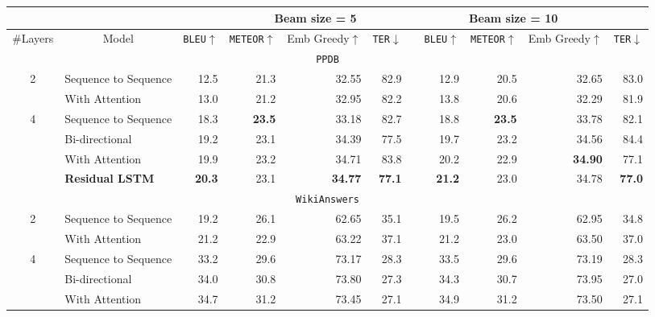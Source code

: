 \begin{center}
\begin{table}
\footnotesize
    \hspace*{-4em}
    \begin{tabular}{@{}clrrrrcrrrr}
        \toprule
        &&& \multicolumn{3}{c}{Beam size = 5} & \phantom{abc} & \multicolumn{3}{c}{Beam size = 10}\tabularnewline
        \midrule
        \#Layers & \multicolumn{1}{c}{Model} & \scriptsize{\texttt{BLEU}}$\uparrow$ & \scriptsize{\texttt{METEOR}}$\uparrow$  & \scriptsize{Emb Greedy}$\uparrow$ & \scriptsize{\texttt{TER}}$\downarrow$  &  & \scriptsize{\texttt{BLEU}}$\uparrow$ & \scriptsize{\texttt{METEOR}}$\uparrow$  & \scriptsize{Emb Greedy}$\uparrow$ & \scriptsize{\texttt{TER}}$\downarrow$ \tabularnewline
        \toprule \multicolumn{11}{c}{\texttt{PPDB}}  \tabularnewline \midrule
        \multirow{2}{*}{2} & Sequence to Sequence & 12.5  & 21.3  & 32.55  & 82.9 & &  12.9 & 20.5 &  32.65 & 83.0 \tabularnewline
        & With Attention                          & 13.0  & 21.2  & 32.95  & 82.2 & &  13.8 & 20.6 &  32.29 & 81.9 \tabularnewline
        \midrule
        \multirow{4}{*}{4} & Sequence to Sequence & 18.3  & \textbf{23.5}  & 33.18  & 82.7 & &  18.8 & \textbf{23.5} &  33.78 & 82.1 \tabularnewline
        & Bi-directional                           & 19.2  & 23.1  & 34.39  & 77.5 & &  19.7 & 23.2 &  34.56 & 84.4 \tabularnewline
        & With Attention                          & 19.9  & 23.2  & 34.71  & 83.8 & &  20.2 & 22.9 &  \textbf{34.90} & 77.1 \tabularnewline
        & \textbf{Residual LSTM}                   & \textbf{20.3}&  23.1& \textbf{34.77}  & \textbf{77.1}& & \textbf{21.2} & 23.0& 34.78 & \textbf{77.0} \tabularnewline
        \bottomrule
        \multicolumn{11}{c}{\texttt{WikiAnswers}}  \tabularnewline \midrule
        \multirow{2}{*}{2} & Sequence to Sequence & 19.2  & 26.1  &   62.65 & 35.1 & &  19.5 & 26.2 & 62.95 & 34.8 \tabularnewline
        & With Attention                          & 21.2  & 22.9  &   63.22 & 37.1 & &  21.2 & 23.0 & 63.50 & 37.0 \tabularnewline
        \midrule
        \multirow{4}{*}{4} & Sequence to Sequence & 33.2  & 29.6  &   73.17 & 28.3 & & 33.5  & 29.6  & 73.19 & 28.3 \tabularnewline
        & Bi-directional                           & 34.0  & 30.8  &   73.80 & 27.3 & & 34.3  & 30.7  & 73.95 & 27.0 \tabularnewline
        & With Attention                          & 34.7  & 31.2  &   73.45 & 27.1 & & 34.9  & 31.2  & 73.50 & 27.1 \tabularnewline

\end{tabular}
\end{table}
\end{center}

